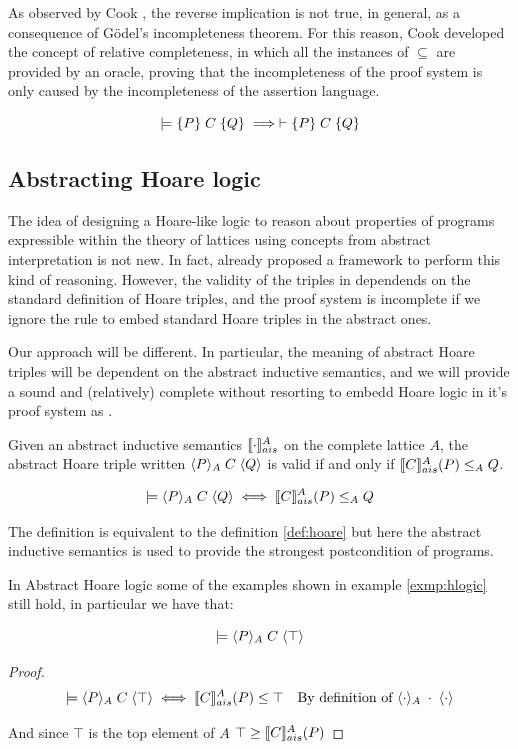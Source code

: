 \documentclass[
  10pt,       %
  twoside,    %
  a4paper,    %
  english,    %
  tikz,       %
  openright,  %
]{book}
\begin{document}
As observed by Cook \cite{Cook78}, the reverse implication is not true, in 
general, as a consequence of Gödel's incompleteness theorem. For this reason, 
Cook developed the concept of relative completeness, in which all the instances 
of $\subseteq$ are provided by an oracle, proving that the incompleteness of the 
proof system is only caused by the incompleteness of the assertion language.

\begin{theorem}
  \label{thm:hlogic-complete}
  $$\models \{ P \} \; C \; \{ Q \} \implies \vdash \{ P \} \; C \; \{ Q \}$$
\end{theorem}

\subsection{Abstracting Hoare logic}
The idea of designing a Hoare-like logic to reason about properties of programs
expressible within the theory of lattices using concepts from abstract
interpretation is not new. In fact, \cite{Cousot12} already proposed a
framework to perform this kind of reasoning. However, the validity of the
triples in \cite{Cousot12} dependends on the standard definition of Hoare
triples, and the proof system is incomplete if we ignore the rule to embed
standard Hoare triples in the abstract ones.

Our approach will be different. In particular, the meaning of abstract Hoare 
triples will be dependent on the abstract inductive semantics, and we will 
provide a sound and (relatively) complete without resorting to embedd Hoare 
logic in it's proof system as \cite{Cousot12}.

\begin{definition}
  \label{def:aht}
  Given an abstract inductive semantics $\llbracket \cdot \rrbracket_{ais}^{A}$ on the complete lattice
  $A$, the abstract Hoare triple written $\langle P \rangle_{A} \; C \; \langle Q \rangle$ is valid if
  and only if $\llbracket C \rrbracket_{ais}^{A}(P) \leq_A Q$.

  $$\models \langle P \rangle_{A} \; C \; \langle Q \rangle \iff \llbracket C \rrbracket_{ais}^{A}(P) \leq_A Q$$
\end{definition}

The definition is equivalent to the definition \ref{def:hoare} 
but here the abstract inductive semantics is used to provide the strongest 
postcondition of programs.

In Abstract Hoare logic some of the examples shown in example \ref{exmp:hlogic} 
still hold, in particular we have that:
\begin{example}
  $$\models \langle P \rangle_{A} \; C \; \langle \top \rangle$$
\end{example}
\begin{proof}
  \begin{align*}
    \models \langle P \rangle_{A} \; C \; \langle \top \rangle
      & \iff \llbracket C \rrbracket_{ais}^{A}(P) \leq \top & \text{By definition of $\langle \cdot \rangle_{A} \; \cdot \; \langle \cdot \rangle$} \\
  \end{align*}

  And since $\top$ is the top element of $A$ $\top \geq \llbracket C \rrbracket_{ais}^{A}(P)$
\end{proof}
\end{document}
